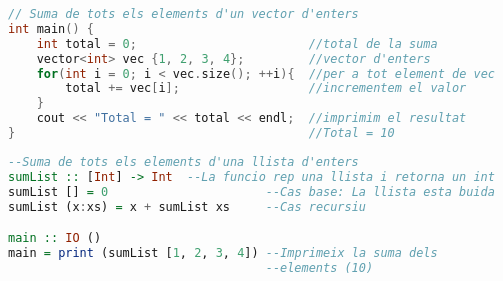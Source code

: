 \usepackage{listings}
\usepackage{xcolor}




\begin{lstlisting}[language=C++,caption={Exemple d'un programa que calcula la suma d'un vector d'enters en C++.}, label={fig:C++}]
// Suma de tots els elements d'un vector d'enters
int main() {
    int total = 0;                        //total de la suma
    vector<int> vec {1, 2, 3, 4};         //vector d'enters
    for(int i = 0; i < vec.size(); ++i){  //per a tot element de vec
        total += vec[i];                  //incrementem el valor
    }
    cout << "Total = " << total << endl;  //imprimim el resultat
}                                         //Total = 10
\end{lstlisting}

\begin{lstlisting}[language=Haskell, caption={Exemple d'un programa que suma una llista d'enters en Haskell.}, label={fig:Haskell}]
--Suma de tots els elements d'una llista d'enters
sumList :: [Int] -> Int  --La funcio rep una llista i retorna un int
sumList [] = 0                      --Cas base: La llista esta buida
sumList (x:xs) = x + sumList xs     --Cas recursiu

main :: IO ()
main = print (sumList [1, 2, 3, 4]) --Imprimeix la suma dels 
                                    --elements (10)
\end{lstlisting}
